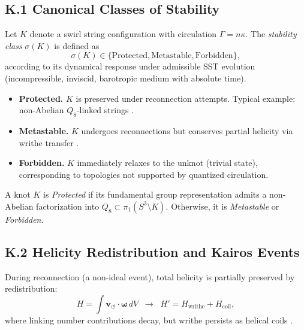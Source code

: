 \documentclass[10pt,reprint,aps,onecolumn,nofootinbib]{revtex4-2}
\begin{document}
    \subsection*{K.1 Canonical Classes of Stability}

    \begin{definition}
        Let $K$ denote a swirl string configuration with circulation $\Gamma = n \kappa$. The \emph{stability class} $\sigma(K)$ is defined as
        \[
            \sigma(K) \in \{ \text{Protected}, \text{Metastable}, \text{Forbidden} \},
        \]
        according to its dynamical response under admissible SST evolution (incompressible, inviscid, barotropic medium with absolute time).
    \end{definition}

    \begin{itemize}
        \item \textbf{Protected.} $K$ is preserved under reconnection attempts. Typical example: non-Abelian $Q_8$-linked strings \cite{Annala2025}.
        \item \textbf{Metastable.} $K$ undergoes reconnections but conserves partial helicity via writhe transfer \cite{Kleckner2016}.
        \item \textbf{Forbidden.} $K$ immediately relaxes to the unknot (trivial state), corresponding to topologies not supported by quantized circulation.
    \end{itemize}

    \begin{corollary}
        A knot $K$ is \emph{Protected} if its fundamental group representation admits a non-Abelian factorization into $Q_8 \subset \pi_1(S^3 \setminus K)$. Otherwise, it is \emph{Metastable} or \emph{Forbidden}.
    \end{corollary}

    \subsection*{K.2 Helicity Redistribution and Kairos Events}

    \begin{axiom}
        During reconnection (a non-ideal event), total helicity is partially preserved by redistribution:
        \[
            H = \int \mathbf{v}_{\!\boldsymbol{\circlearrowleft}} \cdot \boldsymbol{\omega}\, dV
            \;\;\longrightarrow\;\;
            H' = H_{\text{writhe}} + H_{\text{coil}} ,
        \]
        where linking number contributions decay, but writhe persists as helical coils \cite{Ricca1996,Kleckner2016}.
    \end{axiom}
\end{document}
